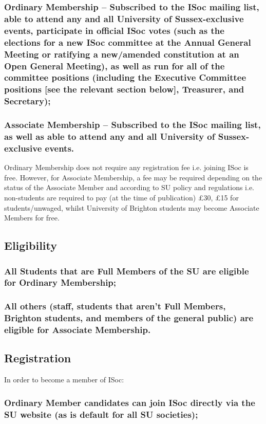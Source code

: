 \documentclass[12pt]{article}
\begin{document}
\subsubsection{Ordinary Membership -- Subscribed to the ISoc mailing list, able to attend any and all University of Sussex-exclusive events, participate in official ISoc votes (such as the elections for a new ISoc committee at the Annual General Meeting or ratifying a new/amended constitution at an Open General Meeting), as well as run for all of the committee positions (including the Executive Committee positions [see the relevant section below], Treasurer, and Secretary);}
\label{subsubsec:membership}
\subsubsection{Associate Membership -- Subscribed to the ISoc mailing list, as well as able to attend any and all University of Sussex-exclusive events.}

Ordinary Membership does not require any registration fee i.e. joining ISoc is free. However, for Associate Membership, a fee may be required depending on the status of the Associate Member and according to SU policy and regulations i.e. non-students are required to pay (at the time of publication) \pounds 30, \pounds 15 for students/unwaged, whilst University of Brighton students may become Associate Members for free.

\subsection{Eligibility}
\subsubsection{All Students that are Full Members of the SU are eligible for Ordinary Membership;}
\subsubsection{All others (staff, students that aren't Full Members, Brighton students, and members of the general public) are eligible for Associate Membership.}

\subsection{Registration}
In order to become a member of ISoc:
\subsubsection{Ordinary Member candidates can join ISoc directly via the SU website (as is default for all SU societies);}
\end{document}
